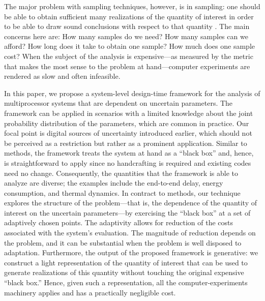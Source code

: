 The major problem with sampling techniques, however, is in sampling: one should
be able to obtain sufficient many realizations of the quantity of interest in
order to be able to draw sound conclusions with respect to that quantity
\cite{diaz-emparanza2002}. The main concerns here are: How many samples do we
need? How many samples can we afford? How long does it take to obtain one
sample? How much does one sample cost? When the subject of the analysis is
expensive---as measured by the metric that makes the most sense to the problem
at hand---computer experiments are rendered as slow and often infeasible.

In this paper, we propose a system-level design-time framework for the analysis
of multiprocessor systems that are dependent on uncertain parameters. The
framework can be applied in scenarios with a limited knowledge about the joint
probability distribution of the parameters, which are common in practice. Our
focal point is digital sources of uncertainty introduced earlier, which should
not be perceived as a restriction but rather as a prominent application. Similar
to  methods, the framework treats the system at hand as a ``black box''
and, hence, is straightforward to apply since no handcrafting is required and
existing codes need no change. Consequently, the quantities that the framework
is able to analyze are diverse; the examples include the end-to-end delay,
energy consumption, and thermal dynamics. In contract to  methods, our
technique explores the structure of the problem---that is, the dependence of the
quantity of interest on the uncertain parameters---by exercising the ``black
box'' at a set of adaptively chosen points. The adaptivity allows for reduction
of the costs associated with the system's evaluation. The magnitude of reduction
depends on the problem, and it can be substantial when the problem is well
disposed to adaptation. Furthermore, the output of the proposed framework is
generative: we construct a light representation of the quantity of interest that
can be used to generate realizations of this quantity without touching the
original expensive ``black box.'' Hence, given such a representation, all the
computer-experiments machinery applies and has a practically negligible cost.

